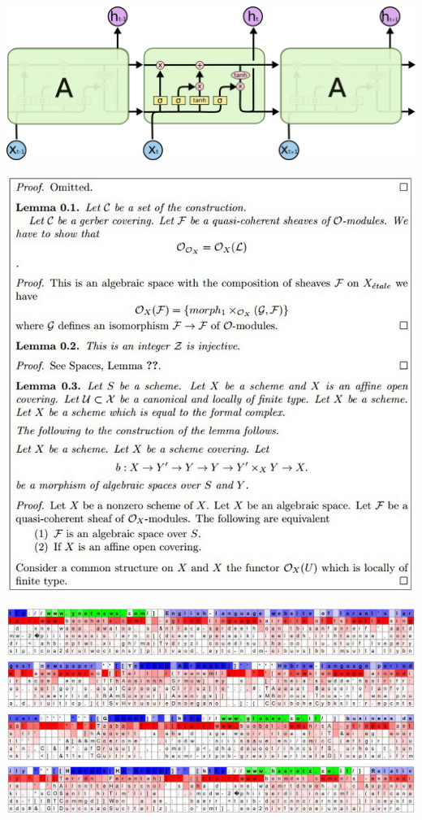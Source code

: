 \documentclass{beamer}
\begin{document}
\begin{frame}
  \begin{center}
    \includegraphics[width=\textwidth]{LSTM3-chain}
  \end{center}
\end{frame}


\begin{frame}
  \begin{center}
    \includegraphics[height=\textheight]{../latex3}
  \end{center}
\end{frame}


\begin{frame}
  \begin{center}
    \includegraphics[width=\textwidth]{lstm1}
  \end{center}
\end{frame}
\end{document}
